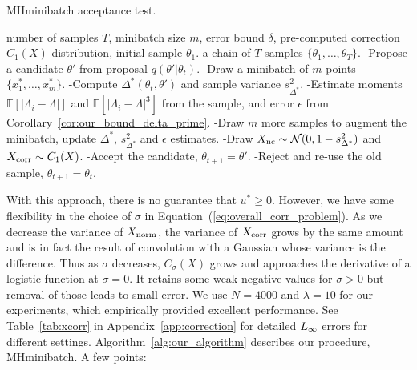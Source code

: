 \documentclass[letterpaper]{article}
\newcommand{\mE}{\mathbb{E}}
\begin{document}
\begin{algorithm}[tb]
\caption{{\sc MHminibatch} acceptance test.}
\label{alg:our_algorithm}
\begin{algorithmic}
     number of samples $T$, minibatch size $m$, error
        bound $\delta$, pre-computed correction $C_1(X)$ distribution, initial
        sample $\theta_1$.
     a chain of $T$ samples
        $\{\theta_1,\ldots,\theta_T\}$.
        \STATE -Propose a candidate $\theta'$ from proposal
            $q(\theta' | \theta_t)$.
        \STATE -Draw a minibatch of $m$ points $\{x_1^*,\ldots,x_m^*\}$.
        \STATE -Compute $\Delta^*(\theta_t,\theta')$ and sample variance
            $s^2_{\Delta^*}$.
        \STATE -Estimate moments $\mE[|\Lambda_i-\Lambda|]$ and
            $\mE[|\Lambda_i-\Lambda|^3]$ from the sample, and error $\epsilon$
            from Corollary~\ref{cor:our_bound_delta_prime}.
            \STATE -Draw $m$ more samples to augment the minibatch, update
                $\Delta^*$, $s^2_{\Delta^*}$ and $\epsilon$ estimates.
        \ENDWHILE
        \STATE -Draw $X_{\rm nc} \sim \mathcal{N}(0,1-s^2_{\Delta^*})$ and
            $X_{\rm corr} \sim C_1(X)$.
        \STATE -Accept the candidate, $\theta_{t+1} = \theta'$.
    \ELSE
        \STATE -Reject and re-use the old sample, $\theta_{t+1} = \theta_t$.
    \ENDIF
    \ENDFOR
\end{algorithmic}
\end{algorithm}

With this approach, there is no guarantee that $u^* \geq 0$. However, we have
some flexibility in the choice of $\sigma$ in
Equation~(\ref{eq:overall_corr_problem}).  As we decrease the variance of
$X_{\rm norm}$, the variance of $X_{\rm corr}$ grows by the same amount and is
in fact the result of convolution with a Gaussian whose variance is the
difference.  Thus as $\sigma$ decreases, $C_\sigma(X)$ grows and approaches the
derivative of a logistic function at $\sigma = 0$. It retains some weak negative
values for $\sigma > 0$ but removal of those leads to small error. We use
$N=4000$ and $\lambda=10$ for our experiments, which empirically provided
excellent performance. See Table~\ref{tab:xcorr} in
Appendix~\ref{app:correction} for detailed $L_{\rm \infty}$ errors for different
settings. Algorithm~\ref{alg:our_algorithm} describes our procedure, {\sc
MHminibatch}. A few points:
\end{document}
